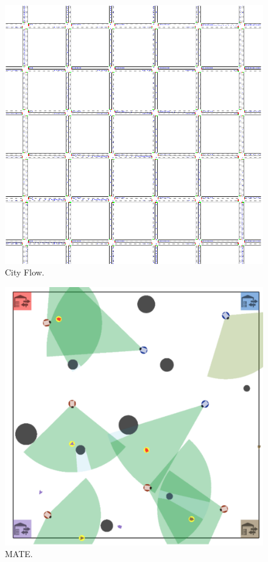     \hfill
    \begin{subfigure}[b]{0.3\textwidth}
        \centering
        \includegraphics[width=\textwidth]{tex_thesis/figures/ch3/city_flow.png}
        \caption{City Flow.}
    \end{subfigure}
    \hfill
    \begin{subfigure}[b]{0.3\textwidth}
        \centering
        \includegraphics[width=\textwidth]{tex_thesis/figures/ch3/MATE.png}
        \caption{MATE.}
    \end{subfigure}